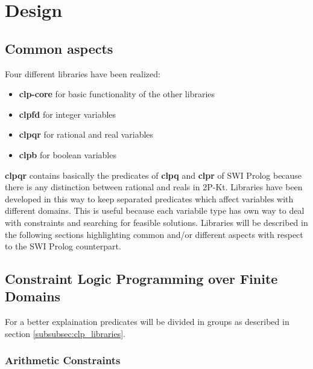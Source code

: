 \section{Design}\label{sec:design_clp}

\subsection{Common aspects}\label{subsec:common_aspects_clp}
Four different libraries have been realized:
\begin{itemize}
    \item \textbf{clp-core} for basic functionality of the other libraries
    \item \textbf{clpfd} for integer variables
    \item \textbf{clpqr} for rational and real variables
    \item \textbf{clpb} for boolean variables
\end{itemize}
\textbf{clpqr} contains basically the predicates of \textbf{clpq} and \textbf{clpr} of SWI Prolog because there
is any distinction between rational and reals in 2P-Kt.\newline
Libraries have been developed in this way to keep separated predicates which affect variables with different domains. This is useful because
each variabile type has own way to deal with constraints and searching for feasible solutions.
Libraries will be described in the following sections highlighting common and/or different aspects with respect to the SWI Prolog counterpart.

\subsection{Constraint Logic Programming over Finite Domains}\label{subsec:clpfd}
For a better explaination predicates will be divided in groups as described in section \ref{subsubsec:clp_libraries}.

\subsubsection{Arithmetic Constraints}\label{subsubsec:arithmetic_constraints}

